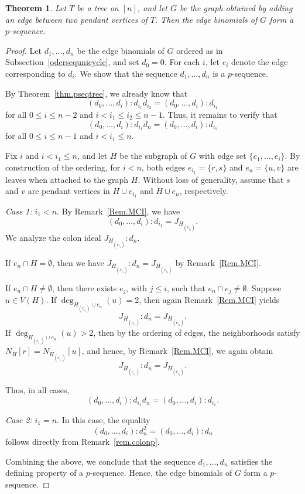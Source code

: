 \documentclass[11pt,a4paper,reqno]{amsart}
\newtheorem{theorem}{Theorem}[section]
\theoremstyle{definition}
\begin{document}
\begin{theorem}\label{thm.pseqcycle}
Let \(T\) be a tree on \([n]\), and let \(G\) be the graph obtained by adding an edge between two pendant vertices of \(T\). Then the edge binomials of \(G\) form a \(p\)-sequence.
\end{theorem}

\begin{proof}
Let \(d_1,\ldots,d_n\) be the edge binomials of \(G\) ordered as in Subsection~\ref{odersequnicycle}, and set \(d_0=0\). For each \(i\), let \(e_i\) denote the edge corresponding to \(d_i\). We show that the sequence \(d_1,\ldots,d_n\) is a \(p\)-sequence.

By Theorem~\ref{thm.pseqtree}, we already know that
\[
(d_0,\ldots,d_i):d_{i_1}d_{i_2}
=
(d_0,\ldots,d_i):d_{i_1}
\]
for all \(0 \le i \le n-2\) and \(i < i_1 \le i_2 \le n-1\). Thus, it remains to verify that
\[
(d_0,\ldots,d_i):d_{i_1}d_n
=
(d_0,\ldots,d_i):d_{i_1}
\]
for all \(0 \le i \le n-1\) and \(i < i_1 \le n\).

Fix \(i\) and \(i<i_1\le n\), and let \(H\) be the subgraph of \(G\) with edge set \(\{e_1,\ldots,e_i\}\). By construction of the ordering, for \(i<n\), both edges \(e_{i_1}=\{r,s\}\) and \(e_n=\{u,v\}\) are leaves when attached to the graph \(H\). Without loss of generality, assume that \(s\) and \(v\) are pendant vertices in \(H \cup e_{i_1}\) and \(H \cup e_n\), respectively.

\medskip

\noindent
\textit{Case 1:} \(i_1 < n\).  
By Remark~\ref{Rem.MCI}, we have
\[
(d_0,\ldots,d_i):d_{i_1} = J_{H_{(e_{i_1})}}.
\]
We analyze the colon ideal \(J_{H_{(e_{i_1})}}:d_n\).

If \(e_n \cap H = \emptyset\), then we have $J_{H_{(e_{i_1})}}:d_n = J_{H_{(e_{i_1})}}$
by Remark~\ref{Rem.MCI}.

If \(e_n \cap H \neq \emptyset\), then there exists \(e_j\), with \(j \le i\), such that \(e_n \cap e_j \neq \emptyset\). Suppose \(u \in V(H)\). If \(\deg_{H_{(e_{i_1})} \cup e_n}(u)=2\), then again Remark~\ref{Rem.MCI} yields
\[
J_{H_{(e_{i_1})}}:d_n = J_{H_{(e_{i_1})}}.
\]
If \(\deg_{H_{(e_{i_1})} \cup e_n}(u)>2\), then by the ordering of edges, the neighborhoods satisfy
$N_{H}[r]=N_{H_{(e_{i_1})}}[u]$,
and hence, by Remark~\ref{Rem.MCI}, we again obtain
\[
J_{H_{(e_{i_1})}}:d_n = J_{H_{(e_{i_1})}}.
\]

Thus, in all cases,
\[
(d_0,\ldots,d_i):d_{i_1}d_n
=
(d_0,\ldots,d_i):d_{i_1}.
\]

\medskip

\noindent
\textit{Case 2:} \(i_1 = n\).  
In this case, the equality
\[
(d_0,\ldots,d_i):d_n^2
=
(d_0,\ldots,d_i):d_n
\]
follows directly from Remark~\ref{rem.colonp}.

\medskip

Combining the above, we conclude that the sequence \(d_1,\ldots,d_n\) satisfies the defining property of a \(p\)-sequence. Hence, the edge binomials of \(G\) form a \(p\)-sequence.
\end{proof}
\end{document}
